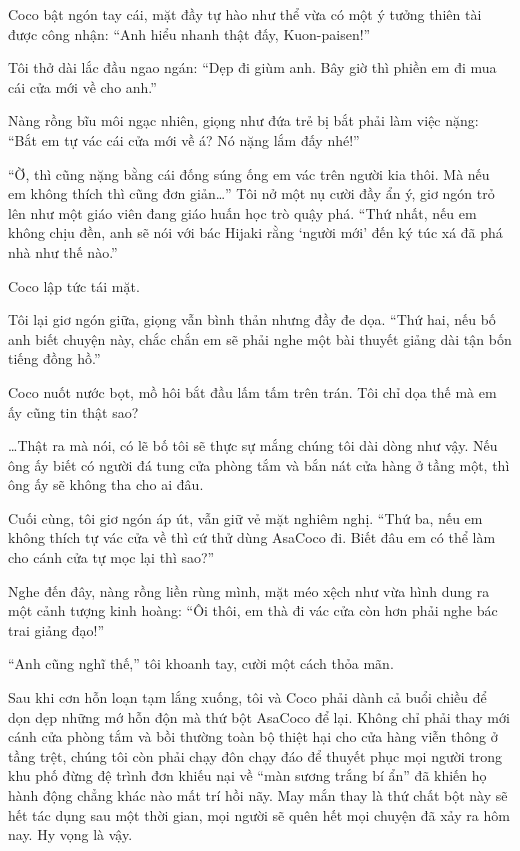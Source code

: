 \documentclass[../main.tex]{subfiles}
\begin{document}
Coco bật ngón tay cái, mặt đầy tự hào như thể vừa có một ý tưởng thiên tài được công nhận: ``Anh hiểu nhanh thật đấy, Kuon-paisen!''

Tôi thở dài lắc đầu ngao ngán: ``Dẹp đi giùm anh. Bây giờ thì phiền em đi mua cái cửa mới về cho anh.''

Nàng rồng bĩu môi ngạc nhiên, giọng như đứa trẻ bị bắt phải làm việc nặng: ``Bắt em tự vác cái cửa mới về á? Nó nặng lắm đấy nhé!''

``Ờ, thì cũng nặng bằng cái đống súng ống em vác trên người kia thôi. Mà nếu em không thích thì cũng đơn giản\dots'' Tôi nở một nụ cười đầy ẩn ý, giơ ngón trỏ lên như một giáo viên đang giáo huấn học trò quậy phá. ``Thứ nhất, nếu em không chịu đền, anh sẽ nói với bác Hijaki rằng `người mới' đến ký túc xá đã phá nhà như thế nào.''

Coco lập tức tái mặt.

Tôi lại giơ ngón giữa, giọng vẫn bình thản nhưng đầy đe dọa. ``Thứ hai, nếu bố anh biết chuyện này, chắc chắn em sẽ phải nghe một bài thuyết giảng dài tận bốn tiếng đồng hồ.''

Coco nuốt nước bọt, mồ hôi bắt đầu lấm tấm trên trán. Tôi chỉ dọa thế mà em ấy cũng tin thật sao?

\dots Thật ra mà nói, có lẽ bố tôi sẽ thực sự mắng chúng tôi dài dòng như vậy. Nếu ông ấy biết có người đá tung cửa phòng tắm và bắn nát cửa hàng ở tầng một, thì ông ấy sẽ không tha cho ai đâu.

Cuối cùng, tôi giơ ngón áp út, vẫn giữ vẻ mặt nghiêm nghị. ``Thứ ba, nếu em không thích tự vác cửa về thì cứ thử dùng AsaCoco đi. Biết đâu em có thể làm cho cánh cửa tự mọc lại thì sao?''

Nghe đến đây, nàng rồng liền rùng mình, mặt méo xệch như vừa hình dung ra một cảnh tượng kinh hoàng: ``Ôi thôi, em thà đi vác cửa còn hơn phải nghe bác trai giảng đạo!''

``Anh cũng nghĩ thế,'' tôi khoanh tay, cười một cách thỏa mãn.

\ct

Sau khi cơn hỗn loạn tạm lắng xuống, tôi và Coco phải dành cả buổi chiều để dọn dẹp những mớ hỗn độn mà thứ bột AsaCoco để lại. Không chỉ phải thay mới cánh cửa phòng tắm và bồi thường toàn bộ thiệt hại cho cửa hàng viễn thông ở tầng trệt, chúng tôi còn phải chạy đôn chạy đáo để thuyết phục mọi người trong khu phố đừng đệ trình đơn khiếu nại về ``màn sương trắng bí ẩn'' đã khiến họ hành động chẳng khác nào mất trí hồi nãy. May mắn thay là thứ chất bột này sẽ hết tác dụng sau một thời gian, mọi người sẽ quên hết mọi chuyện đã xảy ra hôm nay. Hy vọng là vậy.
\end{document}

